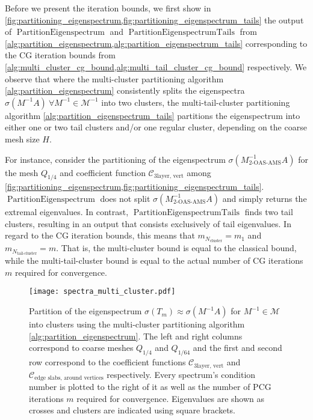 Before we present the iteration bounds, we first show in \cref{fig:partitioning_eigenspectrum,fig:partitioning_eigenspectrum_tails} the output of \newline$\operatorname{PartitionEigenspectrum}$ and $\operatorname{PartitionEigenspectrumTails}$ from \cref{alg:partition_eigenspectrum,alg:partition_eigenspectrum_tails} corresponding to the CG iteration bounds from \cref{alg:multi_cluster_cg_bound,alg:multi_tail_cluster_cg_bound} respectively. We observe that where the multi-cluster partitioning algorithm \cref{alg:partition_eigenspectrum} consistently splits the eigenspectra $\sigma(M^{-1}A) \ \forall M^{-1} \in\mathcal{M}^{-1}$ into two clusters, the multi-tail-cluster partitioning algorithm \cref{alg:partition_eigenspectrum_tails} partitions the eigenspectrum into either one or two tail clusters and/or one regular cluster, depending on the coarse mesh size $H$. 

For instance, consider the partitioning of the eigenspectrum $\sigma(M_{\text{2-OAS-AMS}}^{-1}A)$ for the mesh $Q_{1/4}$ and coefficient function $\mathcal{C}_{\text{3layer, vert}}$ among \cref{fig:partitioning_eigenspectrum,fig:partitioning_eigenspectrum_tails}. $\operatorname{PartitionEigenspectrum}$ does not split $\sigma(M_{\text{2-OAS-AMS}}^{-1}A)$ and simply returns the extremal eigenvalues. In contrast, $\operatorname{PartitionEigenspectrumTails}$ finds two tail clusters, resulting in an output that consists exclusively of tail eigenvalues. In regard to the CG iteration bounds, this means that $m_{N_{\text{cluster}}} = m_1$ and $m_{N_{\text{tail-cluster}}} = m$. That is, the multi-cluster bound is equal to the classical bound, while the multi-tail-cluster bound is equal to the actual number of CG iterations $m$ required for convergence.
\begin{figure}[H]
    \centering
    \texttt{[image: spectra\_multi\_cluster.pdf]}
    \caption{Partition of the eigenspectrum $\sigma(T_m)\approx\sigma(M^{-1}A)$ for $M^{-1}\in\mathcal{M}$ into clusters using the multi-cluster partitioning algorithm \cref{alg:partition_eigenspectrum}. The left and right columns correspond to coarse meshes $Q_{1/4}$ and $Q_{1/64}$ and the first and second row correspond to the coefficient functions $\mathcal{C}_{\text{3layer, vert}}$ and $\mathcal{C}_{\text{edge slabs, around vertices}}$ respectively. Every spectrum's condition number is plotted to the right of it as well as the number of PCG iterations $m$ required for convergence. Eigenvalues are shown as crosses and clusters are indicated using square brackets.}
    \label{fig:partitioning_eigenspectrum}
\end{figure}

